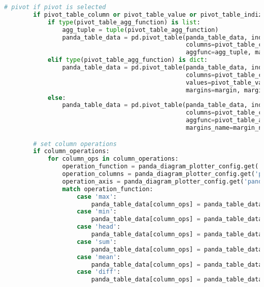 \begin{lstlisting}[language=python, caption=Python LaTex - pandas\_data\_chart\_plotter.py CSV - Diagramm,captionpos=b,label={lst:pandas_data_chart_plotter},breaklines=true]
        # pivot if pivot is selected
        if pivot_table_column or pivot_table_value or pivot_table_indizes:
            if type(pivot_table_agg_function) is list:
                agg_tuple = tuple(pivot_table_agg_function)
                panda_table_data = pd.pivot_table(panda_table_data, index=pivot_table_indizes,
                                                  columns=pivot_table_column, values=pivot_table_value,
                                                  aggfunc=agg_tuple, margins=margin, margins_name=margin_name)
            elif type(pivot_table_agg_function) is dict:
                panda_table_data = pd.pivot_table(panda_table_data, index=pivot_table_indizes,
                                                  columns=pivot_table_column,
                                                  values=pivot_table_value, aggfunc=pivot_table_agg_function,
                                                  margins=margin, margins_name=margin_name)
            else:
                panda_table_data = pd.pivot_table(panda_table_data, index=pivot_table_indizes,
                                                  columns=pivot_table_column, values=pivot_table_value,
                                                  aggfunc=pivot_table_agg_function, margins=margin,
                                                  margins_name=margin_name)

        # set column operations
        if column_operations:
            for column_ops in column_operations:
                operation_function = panda_diagram_plotter_config.get('panda_diagram_plotter').get(table_item).get('column_operations').get('operations').get(column_ops).get('operation_function')
                operation_columns = panda_diagram_plotter_config.get('panda_diagram_plotter').get(table_item).get('column_operations').get('operations').get(column_ops).get('columns')
                operation_axis = panda_diagram_plotter_config.get('panda_diagram_plotter').get(table_item).get('column_operations').get('operations').get(column_ops).get('axis_number')
                match operation_function:
                    case 'max':
                        panda_table_data[column_ops] = panda_table_data[operation_columns].max()
                    case 'min':
                        panda_table_data[column_ops] = panda_table_data[operation_columns].min()
                    case 'head':
                        panda_table_data[column_ops] = panda_table_data[operation_columns].head()
                    case 'sum':
                        panda_table_data[column_ops] = panda_table_data[operation_columns].sum(axis=operation_axis)
                    case 'mean':
                        panda_table_data[column_ops] = panda_table_data[operation_columns].mean()
                    case 'diff':
                        panda_table_data[column_ops] = panda_table_data[operation_columns[1]] - panda_table_data[operation_columns[0]]



\end{lstlisting}
